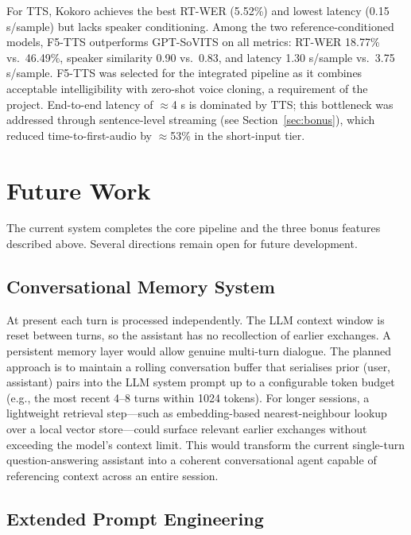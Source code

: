 \documentclass[12pt, a4paper]{article}
\begin{document}
For TTS, Kokoro achieves the best RT-WER (5.52\%) and lowest latency (0.15 s/sample) but lacks speaker conditioning. Among the two reference-conditioned models, F5-TTS outperforms GPT-SoVITS on all metrics: RT-WER 18.77\% vs.\ 46.49\%, speaker similarity 0.90 vs.\ 0.83, and latency 1.30 s/sample vs.\ 3.75 s/sample. F5-TTS was selected for the integrated pipeline as it combines acceptable intelligibility with zero-shot voice cloning, a requirement of the project. End-to-end latency of $\approx$4 s is dominated by TTS; this bottleneck was addressed through sentence-level streaming (see Section~\ref{sec:bonus}), which reduced time-to-first-audio by $\approx$53\% in the short-input tier.

\section{Future Work}

The current system completes the core pipeline and the three bonus features described above. Several directions remain open for future development.

\subsection{Conversational Memory System}

At present each turn is processed independently. The LLM context window is reset between turns, so the assistant has no recollection of earlier exchanges. A persistent memory layer would allow genuine multi-turn dialogue. The planned approach is to maintain a rolling conversation buffer that serialises prior (user, assistant) pairs into the LLM system prompt up to a configurable token budget (e.g., the most recent 4--8 turns within 1024 tokens). For longer sessions, a lightweight retrieval step---such as embedding-based nearest-neighbour lookup over a local vector store---could surface relevant earlier exchanges without exceeding the model's context limit. This would transform the current single-turn question-answering assistant into a coherent conversational agent capable of referencing context across an entire session.

\subsection{Extended Prompt Engineering}
\end{document}
